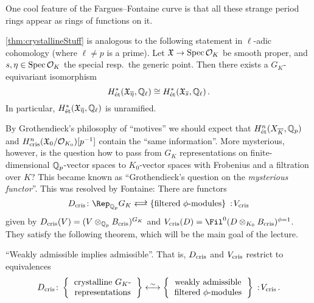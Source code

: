 \documentclass[a4paper, 10pt, oneside, DIV=9, chapterprefix=true, numbers=enddot,bibliography=totoc]{scrbook}
\begin{document}
\begin{rem}
\begin{numerate}
		One cool feature of the Fargues--Fontaine curve is that all these strange period rings appear as rings of functions on it.
		\item \cref{thm:crystallineStuff} is analogous to the following statement in $\ell$-adic cohomology (where $\ell\neq p$ is a prime). Let $\XX\morphism\Spec \Oo_K$ be smooth proper, and $s,\eta\in\operatorname{Spec} \mathcal{O}_K$ the special resp.\ the generic point. Then there exists a $G_K$-equivariant isomorphism
		\begin{equation*}
			H_\et^*(\XX_{\ov{\eta}},\IQ_\ell)\cong H_\et^*(\XX_{\ov{s}},\IQ_\ell)\,.
		\end{equation*}
		In particular, $H_\et^*(\XX_{\ov{\eta}},\IQ_\ell)$ is unramified.
		\item By Grothendieck's philosophy of \enquote{motives} we should expect that $H_\et^n(X_{\ov{K}},\IQ_p)$ and $H_{\mathrm{cris}}^n(\mathfrak{X}_0/\mathcal{O}_{K_0})[p^{-1}]$ contain the \enquote{same information}. More mysterious, however, is the question how to pass from $G_K$ representations on finite-dimensional $\mathbb{Q}_p$-vector spaces to $K_0$-vector spaces with Frobenius and a filtration over $K$? This became known as \enquote{Grothendieck's question on the \emph{mysterious functor}}. This was resolved by Fontaine: There are functors
		\begin{equation*}
			D_\cris\colon \Rep_{\IQ_p}G_K \doublelrmorphism \left\{\text{filtered }\phi\text{-modules}\right\}\noloc V_\cris
		\end{equation*} 
		given by $D_{\mathrm{cris}}(V)=(V\otimes_{\mathbb{Q}_p}B_{\mathrm{cris}})^{G_K}$ and $V_\cris(D)=\Fil^0(D\otimes_{K_0}B_\cris)^{\phi=1}$. They satisfy the following theorem, which will be the main goal of the lecture.
	\end{numerate}
\end{rem}
\begin{thm}\label{thm:ColmerzFontaine}
	\enquote{Weakly admissible implies admissible}. That is, $D_{\mathrm{cris}}$ and $V_{\mathrm{cris}}$ restrict to equivalences
	\begin{equation*}
		D_\cris\colon\left\{
		\begin{tabular}{c}
			crystalline $G_K$-\\
			representations
		\end{tabular}\right\}\lrisomorphism \left\{
		\begin{tabular}{c}
			weakly admissible\\
			filtered $\phi$-modules
		\end{tabular}
		\right\}\noloc V_\cris\,.
	\end{equation*}
\end{thm}
\end{document}
